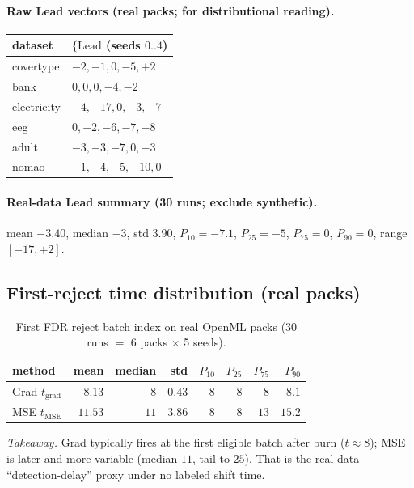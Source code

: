 \documentclass[11pt]{article}
\newcommand{\Lead}{\mathrm{Lead}}
\begin{document}
\paragraph{Raw Lead vectors (real packs; for distributional reading).}
\begin{center}
\small
\begin{tabular}{ll}
\toprule
dataset & $\{\Lead$ (seeds $0..4$) \\
\midrule
covertype & $-2,-1,0,-5,+2$ \\
bank & $0,0,0,-4,-2$ \\
electricity & $-4,-17,0,-3,-7$ \\
eeg & $0,-2,-6,-7,-8$ \\
adult & $-3,-3,-7,0,-3$ \\
nomao & $-1,-4,-5,-10,0$ \\
\bottomrule
\end{tabular}
\end{center}

\paragraph{Real-data Lead summary (30 runs; exclude synthetic).}
mean $-3.40$, median $-3$, std $3.90$,
$P_{10}{=}-7.1$, $P_{25}{=}-5$, $P_{75}{=}0$, $P_{90}{=}0$,
range $[-17,+2]$.

\subsection{First-reject time distribution (real packs)}
\begin{table}[h]
\centering
\caption{First FDR reject batch index on real OpenML packs
(30 runs $=$ 6 packs $\times$ 5 seeds).}
\label{tab:treject}
\begin{tabular}{lrrrrrrr}
\toprule
method & mean & median & std & $P_{10}$ & $P_{25}$ & $P_{75}$ & $P_{90}$ \\
\midrule
Grad $t_{\mathrm{grad}}$ & $8.13$ & $8$ & $0.43$ & $8$ & $8$ & $8$ & $8.1$ \\
MSE  $t_{\mathrm{MSE}}$  & $11.53$ & $11$ & $3.86$ & $8$ & $8$ & $13$ & $15.2$ \\
\bottomrule
\end{tabular}
\end{table}

\noindent\textit{Takeaway.} Grad typically fires at the first eligible
batch after burn ($t{\approx}8$); MSE is later and more variable
(median $11$, tail to $25$). That is the real-data ``detection-delay''
proxy under no labeled shift time.
\end{document}
